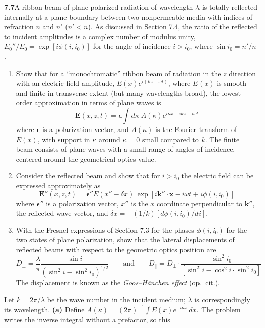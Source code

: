 \par\bigskip
\noindent\textbf{7.7}\quad A ribbon beam of plane-polarized radiation of wavelength $\lambda$ is totally reflected internally at a plane boundary between two nonpermeable media with indices of refraction $n$ and $n'$ ($n'<n$). As discussed in Section 7.4, the ratio of the reflected to incident amplitudes is a complex number of modulus unity, $E_{0}''/E_{0}=\exp[i\phi(i,i_{0})]$ for the angle of incidence $i>i_{0}$, where $\sin i_{0}=n'/n$.
\begin{enumerate}
\item[(a)] Show that for a ``monochromatic'' ribbon beam of radiation in the $z$ direction with an electric field amplitude, $E(x)e^{i(kz-\omega t)}$, where $E(x)$ is smooth and finite in transverse extent (but many wavelengths broad), the lowest order approximation in terms of plane waves is
\[
\mathbf{E}(x,z,t)=\boldsymbol{\epsilon}\int d\kappa\;A(\kappa)e^{i\kappa x+ikz-i\omega t}
\]
where $\boldsymbol{\epsilon}$ is a polarization vector, and $A(\kappa)$ is the Fourier transform of $E(x)$, with support in $\kappa$ around $\kappa=0$ small compared to $k$. The finite beam consists of plane waves with a small range of angles of incidence, centered around the geometrical optics value.
\item[(b)] Consider the reflected beam and show that for $i>i_{0}$ the electric field can be expressed approximately as
\[
\mathbf{E}''(x,z,t)=\boldsymbol{\epsilon}''E(x''-\delta x)\,\exp[i\mathbf{k}''\cdot\mathbf{x}-i\omega t+i\phi(i,i_{0})]
\]
where $\boldsymbol{\epsilon}''$ is a polarization vector, $x''$ is the $x$ coordinate perpendicular to $\mathbf{k}''$, the reflected wave vector, and $\delta x=-(1/k)[d\phi(i,i_{0})/di]$.
\item[(c)] With the Fresnel expressions of Section 7.3 for the phases $\phi(i,i_{0})$ for the two states of plane polarization, show that the lateral displacements of reflected beams with respect to the geometric optics position are
\[
D_{\perp}=\frac{\lambda}{\pi}\frac{\sin i}{(\sin^{2}i-\sin^{2}i_{0})^{1/2}}\qquad\text{and}\qquad
D_{\parallel}=D_{\perp}\cdot\frac{\sin^{2}i_{0}}{[\sin^{2}i-\cos^{2}i\cdot\sin^{2}i_{0}]}
\]
The displacement is known as the \emph{Goos--H\"anchen effect} (op.\ cit.).
\end{enumerate}
\solution
Let $k=2\pi/\lambda$ be the wave number in the incident medium;
$\lambda$ is correspondingly its wavelength.
\textbf{(a)} Define
$A(\kappa)=(2\pi)^{-1}\int E(x)e^{-i\kappa x}\,dx$.
The problem writes the inverse integral without a prefactor, so this
